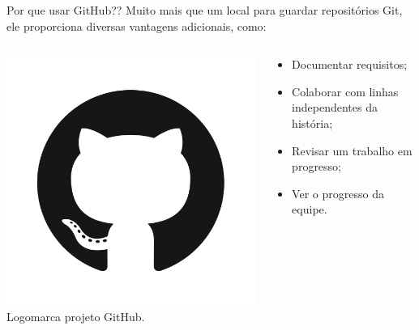 \documentclass{beamer}
\begin{document}
\begin{frame}{Por que usar GitHub??}
   Muito mais que um local para guardar repositórios Git, ele proporciona diversas vantagens adicionais, como:
  \begin{columns}
    \begin{column}{0.3\textwidth}
       \includegraphics[height=0.4\paperheight]{fig/aula3/github_logo.png} \\
       \tiny{Logomarca projeto GitHub}.
    \end{column}
    \begin{column}{0.5\textwidth}
      \begin{itemize}
        \item Documentar requisitos;
	 \item Colaborar com linhas independentes da história;
	 \item Revisar um trabalho em progresso;
	 \item Ver o progresso da equipe.
      \end{itemize} 
    \end{column}    
  \end{columns}
\end{frame}
\end{document}
